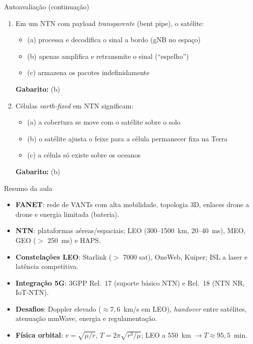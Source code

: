 \documentclass[aspectratio=169,11pt]{beamer}
\begin{document}
\begin{frame}{Autoavaliação (continuação)}
  \begin{enumerate}
    \item Em um NTN com payload \emph{transparente} (bent pipe), o satélite:
      \begin{itemize}
        \item (a) processa e decodifica o sinal a bordo (gNB no espaço)
        \item (b) apenas amplifica e retransmite o sinal (``espelho'')
        \item (c) armazena os pacotes indefinidamente
      \end{itemize}
      \pause
      \textbf{Gabarito:} (b)
    \item Células \emph{earth-fixed} em NTN significam:
      \begin{itemize}
        \item (a) a cobertura se move com o satélite sobre o solo
        \item (b) o satélite ajusta o feixe para a célula permanecer fixa na Terra
        \item (c) a célula só existe sobre os oceanos
      \end{itemize}
      \pause
      \textbf{Gabarito:} (b)
  \end{enumerate}
\end{frame}

\begin{frame}{Resumo da aula}
  \begin{itemize}
    \item \textbf{FANET}: rede de VANTs com alta mobilidade, topologia 3D, enlaces drone a drone e energia limitada (bateria).
    \item \textbf{NTN}: plataformas aéreas/espaciais; LEO (300--1500~km, 20--40~ms), MEO, GEO ($>$ 250~ms) e HAPS.
    \item \textbf{Constelações LEO}: Starlink ($>$ 7000 sat), OneWeb, Kuiper; ISL a laser e latência competitiva.
    \item \textbf{Integração 5G}: 3GPP Rel.~17 (suporte básico NTN) e Rel.~18 (NTN NR, IoT-NTN).
    \item \textbf{Desafios}: Doppler elevado ($\approx 7{,}6$~km/s em LEO), \emph{handover} entre satélites, atenuação mmWave, energia e regulamentação.
    \item \textbf{Física orbital}: $v = \sqrt{\mu/r}$, $T = 2\pi\sqrt{r^3/\mu}$; LEO a 550~km $\rightarrow T \approx 95{,}5$~min.
  \end{itemize}
\end{frame}
\end{document}
